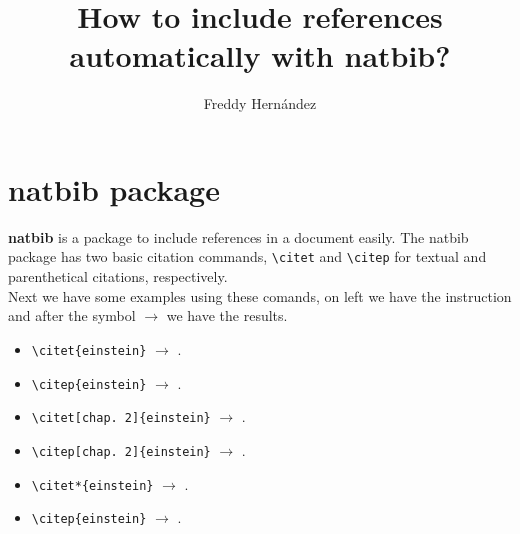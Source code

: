 \documentclass[10pt]{article}
\begin{document}
	
	\title{How to include references automatically with \textbf{natbib}?}
	\author{Freddy Hern\'andez}
	\maketitle
\section{\textbf{natbib} package}
\textbf{natbib} is a package to include references in a document easily. The natbib package has two basic citation commands, \verb|\citet| and \verb|\citep| for textual and parenthetical citations, respectively.\\

Next we have some examples using these comands, on left we have the instruction and after the symbol $\longrightarrow$ we have the results.

\begin{itemize}
	\item \verb|\citet{einstein}| $\longrightarrow$ \citet{einstein}. \\
	\item \verb|\citep{einstein}| $\longrightarrow$ \citep{einstein}. \\
	\item \verb|\citet[chap. 2]{einstein}| $\longrightarrow$ \citet[chap. 2]{einstein}. \\
	\item \verb|\citep[chap. 2]{einstein}| $\longrightarrow$ \citep[chap. 2]{einstein}. \\
	\item \verb|\citet*{einstein}| $\longrightarrow$ \citet{einstein}. \\
	\item \verb|\citep{einstein}| $\longrightarrow$ \citep{einstein}. \\
\end{itemize}



\end{document}
